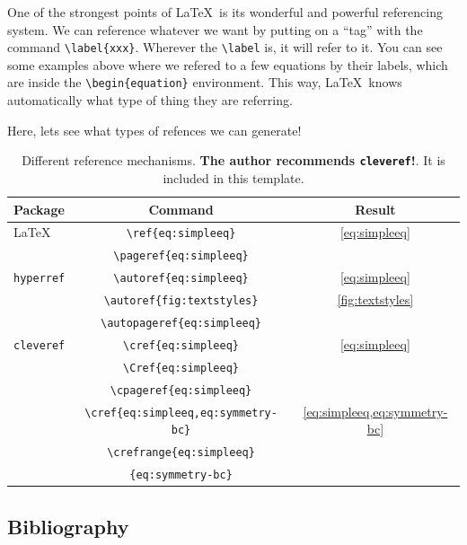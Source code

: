 One of the strongest points of \LaTeX\ is its wonderful and powerful referencing system. We can reference whatever we want by putting on a ``tag'' with the command \verb|\label{xxx}|. Wherever the \verb|\label| is, it will refer to it. You can see some examples above where we refered to a few equations by their labels, which are inside the \verb|\begin{equation}| environment. This way, \LaTeX\ knows automatically what type of thing they are referring.

Here, lets see what types of refences we can generate!

\begin{table}[h]
	\centering
	\begin{tabular}{lcc}
	  \toprule
	  Package & Command & Result \\
	  \midrule
	  \LaTeX & \verb|\ref{eq:simpleeq}| & \ref{eq:simpleeq} \\
	  & \verb|\pageref{eq:simpleeq}| & \pageref{eq:simpleeq} \\
	  \cmidrule{2-3}
	  \texttt{hyperref} & \verb|\autoref{eq:simpleeq}| & \autoref{eq:simpleeq} \\
			  & \verb|\autoref{fig:textstyles}| & \autoref{fig:textstyles} \\
			  & \verb|\autopageref{eq:simpleeq}| & \autopageref{eq:simpleeq} \\
	  \cmidrule{2-3}
	  \texttt{cleveref} & \verb|\cref{eq:simpleeq}| & \cref{eq:simpleeq} \\
			  & \verb|\Cref{eq:simpleeq}| & \Cref{eq:simpleeq} \\
	  & \verb|\cpageref{eq:simpleeq}| & \cpageref{eq:simpleeq} \\
			  & \verb|\cref{eq:simpleeq,eq:symmetry-bc}| & \cref{eq:simpleeq,eq:symmetry-bc} \\
			  & \verb|\crefrange{eq:simpleeq}| & \multirow{2}{*}{\crefrange{eq:simpleeq}{eq:symmetry-bc}}\\
	  & \verb|{eq:symmetry-bc}| & \\
	  \bottomrule
	\end{tabular}
	\caption[Different reference mechanisms.]{Different reference mechanisms. \textbf{The author recommends \texttt{cleveref}!}. It is included in this template.}
	\label{tab:reference-systems}
\end{table}

\subsection{Bibliography}

